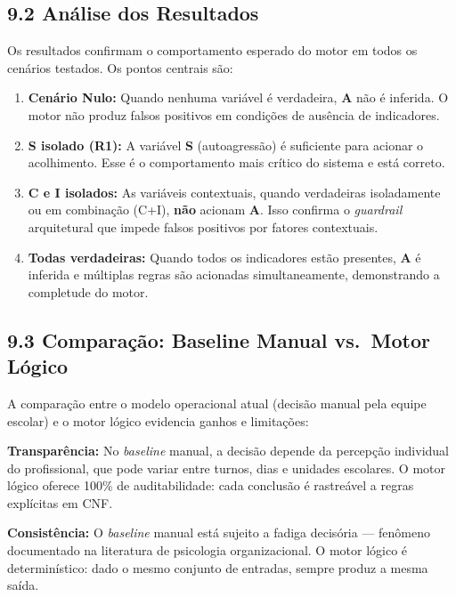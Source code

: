 \documentclass[11pt]{article}
\begin{document}
    \subsection{9.2 Análise dos Resultados}\label{anuxe1lise-dos-resultados}

Os resultados confirmam o comportamento esperado do motor em todos os
cenários testados. Os pontos centrais são:

\begin{enumerate}
\def\labelenumi{\arabic{enumi}.}
\item
  \textbf{Cenário Nulo:} Quando nenhuma variável é verdadeira,
  \textbf{A} não é inferida. O motor não produz falsos positivos em
  condições de ausência de indicadores.
\item
  \textbf{S isolado (R1):} A variável \textbf{S} (autoagressão) é
  suficiente para acionar o acolhimento. Esse é o comportamento mais
  crítico do sistema e está correto.
\item
  \textbf{C e I isolados:} As variáveis contextuais, quando verdadeiras
  isoladamente ou em combinação (C+I), \textbf{não} acionam \textbf{A}.
  Isso confirma o \emph{guardrail} arquitetural que impede falsos
  positivos por fatores contextuais.
\item
  \textbf{Todas verdadeiras:} Quando todos os indicadores estão
  presentes, \textbf{A} é inferida e múltiplas regras são acionadas
  simultaneamente, demonstrando a completude do motor.
\end{enumerate}

\subsection{9.3 Comparação: Baseline Manual vs.~Motor
Lógico}\label{comparauxe7uxe3o-baseline-manual-vs.-motor-luxf3gico}

A comparação entre o modelo operacional atual (decisão manual pela
equipe escolar) e o motor lógico evidencia ganhos e limitações:

\textbf{Transparência:} No \emph{baseline} manual, a decisão depende da
percepção individual do profissional, que pode variar entre turnos, dias
e unidades escolares. O motor lógico oferece 100\% de auditabilidade:
cada conclusão é rastreável a regras explícitas em CNF.

\textbf{Consistência:} O \emph{baseline} manual está sujeito a fadiga
decisória --- fenômeno documentado na literatura de psicologia
organizacional. O motor lógico é determinístico: dado o mesmo conjunto
de entradas, sempre produz a mesma saída.
\end{document}
